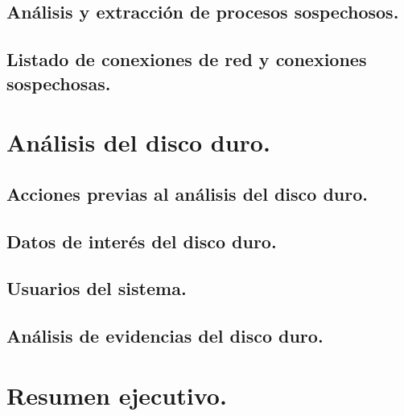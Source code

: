 \documentclass[12pt,a4paper]{report}
\begin{document}
\section{Análisis y extracción de procesos sospechosos.}

\clearpage

\section{Listado de conexiones de red y conexiones sospechosas.}

\clearpage

\chapter{Análisis del disco duro.}

\clearpage

\section{Acciones previas al análisis del disco duro.}

\clearpage

\section{Datos de interés del disco duro.}

\clearpage

\section{Usuarios del sistema.}

\clearpage

\section{Análisis de evidencias del disco duro.}

\clearpage

\chapter{Resumen ejecutivo.}

\clearpage
\end{document}
